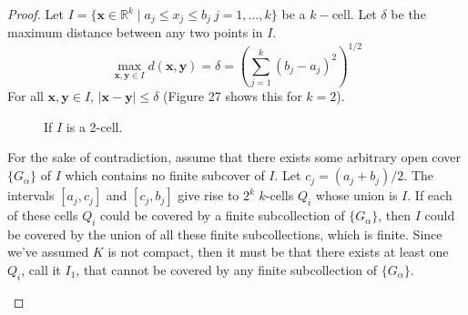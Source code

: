 \documentclass{article}
\newcommand{\R}{\mathbb{R}}
\newcommand{\x}{\mathbf{x}}
\newcommand{\y}{\mathbf{y}}
\theoremstyle{definition}
\begin{document}
\begin{proof}
	Let $ I=\{\x\in\R^k\mid a_j\le x_j\le b_j\ j=1,\ldots,k\} $ be a $ k- $cell. Let $ \delta $ be the maximum distance between any two points in $ I $.
	$$ \max\limits_{\x,\y\in I}d(\x,\y)=\delta=\left(\sum_{j=1}^k(b_j-a_j)^2\right)^{1/2}$$
	For all $ \x,\y\in I $, $ |\x-\y|\le\delta $ (Figure 27 shows this for $ k=2 $). 
			\begin{figure}[h!]
		\centering
		\caption{If $ I $ is a 2-cell.}
	\end{figure}

For the sake of contradiction, assume that there exists some arbitrary open cover $ \{G_\alpha\} $ of $ I $ which contains no finite subcover of $ I $. Let $ c_j=(a_j+b_j)/2 $. The intervals $ [a_j,c_j] $ and $ [c_j,b_j] $ give rise to $ 2^k $ $ k $-cells $ Q_i $ whose union is $ I $. If each of these cells $ Q_i $ could be covered by a finite subcollection of $ \{G_\alpha\} $, then $ I $ could be covered by the union of all these finite subcollections, which is finite. Since we've assumed $ K $ is not compact, then it must be that there exists at least one $ Q_i $, call it $ I_1 $, that cannot be covered by any finite subcollection of $ \{G_\alpha\} $.  
	\begin{figure}[h!]
	\centering
	\begin{tikzpicture}
	

\end{tikzpicture}
\end{figure}
\end{proof}
\end{document}
